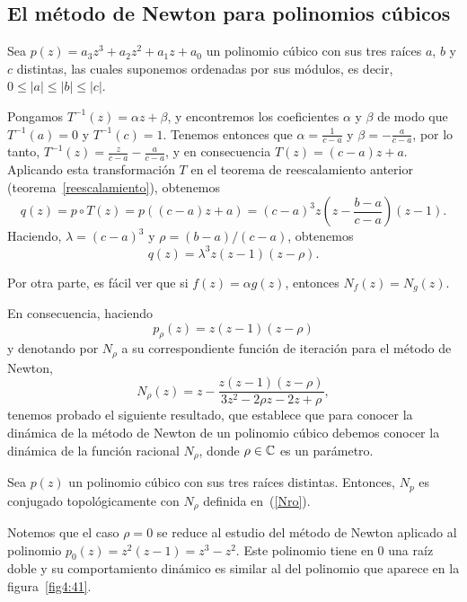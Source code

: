 \subsection{El método de Newton para polinomios cúbicos}

Sea $p(z)= a_3z^3+a_2z^2+a_1z+a_0$  un polinomio cúbico con
sus tres raíces  $a$, $b$ y $c$ distintas, las
cuales suponemos ordenadas por sus módulos, es decir,  $0 \le
|a| \le |b| \le |c|$.

Pongamos $ T^{-1}(z) = \alpha z + \beta $, y encontremos los
coeficientes $ \alpha$ y $ \beta$  de modo que $
T^{-1}(a) = 0$ y $ T^{-1}(c) = 1$. Tenemos entonces que $
\alpha = \frac{1}{c-a}$ y $ \beta = - \frac{a}{c-a}$, por lo
tanto, $ T^{-1}(z) = \frac{z}{c-a} - \frac{a}{c-a}$, y en
consecuencia $ T(z) = (c-a) z + a$. Aplicando esta
transformación $T$ en el teorema de  reescalamiento
anterior (teorema~\ref{reescalamiento}), obtenemos
$$
q(z) = p \circ T (z)  = p ( (c-a) z + a)= (c-a)^3 z \left( z -
\frac{b-a}{c-a}\right) ( z -1 ) .
$$
Haciendo, $ \lambda = ( c - a)^3$ y $ \rho =
(b-a)/(c-a)$, obtenemos
$$
q(z) = \lambda^3  z ( z - 1)( z - \rho ) .
$$

Por otra parte, es fácil ver que si $ f(z) = \alpha g(z)$,
entonces  $ N_f(z) =
N_g(z)$.

En consecuencia,  haciendo 
\begin{equation}\label{prho}
p_{\rho}(z) = z (z-1)(z-\rho)
\end{equation}
 y
denotando por $N_{\rho}$ a su correspondiente función de iteración para el método de Newton,
\begin{equation}\label{Nro}
 N_{\rho}(z)=z-\frac{ z (z-1)(z-\rho)}{3 z^2-2 \rho z-2 z+\rho},
\end{equation}
 tenemos
probado el siguiente resultado, que establece que para conocer la
di\-ná\-mi\-ca de la método de Newton de un polinomio
cúbico debemos conocer la dinámica de la función racional $N_{\rho}$, donde $ \rho \in \mathbb{C}$ es un parámetro.

\begin{teorema}
Sea $ p(z)$ un polinomio cúbico con sus tres raíces
distintas. Entonces, $ N_p$ es conjugado topológicamente con
$N_{\rho}$ definida en~(\ref{Nro}).
\end{teorema}

Notemos que el caso $ \rho = 0 $ se reduce al estudio del método de Newton aplicado al polinomio $ p_0 (z) = z^2 (z-1) = z^3 -
z^2$. Este polinomio tiene en $0$ una raíz doble y su comportamiento dinámico es similar al del polinomio que aparece en la figura~\ref{fig4:41}.

